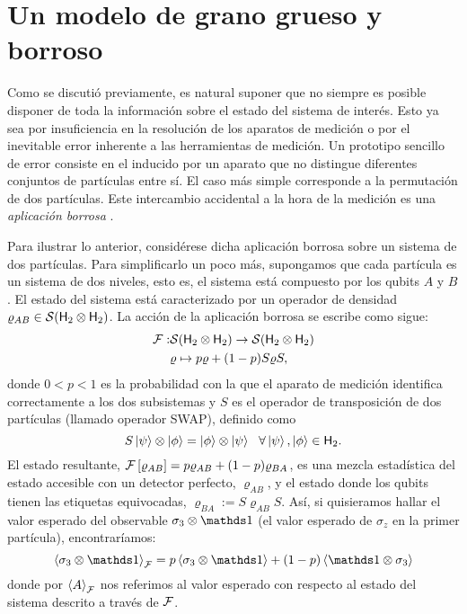\section{Un modelo de grano grueso y borroso}\label{sec:CH2CG}


Como se discutió previamente, es natural suponer que no siempre es posible disponer de toda la información sobre el estado\acnote{\checkmark} del sistema de interés. Esto ya sea por insuficiencia en la resolución de los aparatos de medición o por el inevitable error inherente a las herramientas de medición. Un prototipo sencillo de error consiste en el inducido por un aparato que no distingue diferentes conjuntos de partículas entre sí. El caso más simple corresponde a la permutación de dos partículas. Este intercambio accidental a la hora de la medición es una \textit{aplicación borrosa} \cite{FuzzyMeasurements}.

Para ilustrar lo anterior, considérese dicha aplicación borrosa sobre un sistema de dos partículas. Para simplificarlo un poco más, supongamos que cada partícula es un sistema de dos niveles, esto es, el sistema está compuesto por los qubits $A$ y $B$. El estado del sistema está caracterizado por un operador de densidad $\varrho_{AB} \in \mathcal{S}({\sf H}_2 \otimes {\sf H}_2)$. La acción de la aplicación borrosa se escribe como sigue:
\begin{align}
\mathcal{F}:&\mathcal{S}({\sf H}_2 \otimes {\sf H}_2)\to \mathcal{S}({\sf H}_2 \otimes {\sf H}_2)\nonumber\\
&\varrho \mapsto p\varrho+(1-p)S\varrho S,\nonumber
\end{align}
donde $0<p<1$ es la probabilidad con la que el aparato de medición identifica correctamente \acnote{\checkmark} a los dos subsistemas y $S$ es el operador de transposición de dos partículas (llamado operador SWAP), definido como 
\begin{equation}
    S\ket{\psi}\otimes \ket{\phi}=\ket{\phi}\otimes \ket{\psi} \ \ \forall \ket{\psi},\ket{\phi}\in {\sf H}_2.\nonumber
\end{equation}
El estado resultante, $\mathcal{F}\left[\varrho_{AB}\right]=p\varrho_{AB}+(1-p)\varrho_{BA}$, es una mezcla estadística del estado accesible con un detector perfecto, $\varrho_{AB}$, y el estado donde los qubits tienen las etiquetas equivocadas, $\varrho_{BA}:=S\varrho_{AB} S$. Así, si quisieramos hallar el valor esperado del observable $\sigma_{3}\otimes\Id$ (el valor esperado de $\sigma_{z}$ en la primer partícula), encontraríamos:
\begin{equation}
    \expval{\sigma_{3}\otimes\Id}_{\mcF}=p\expval{\sigma_{3}\otimes\Id}+(1-p)\expval{\Id\otimes\sigma_{3}}\nonumber
\end{equation}\acnote{\checkmark}
donde por $\expval{A}_{\mathcal{F}}$ nos referimos al valor esperado con respecto al estado del sistema descrito a través de $\mathcal{F}$.

